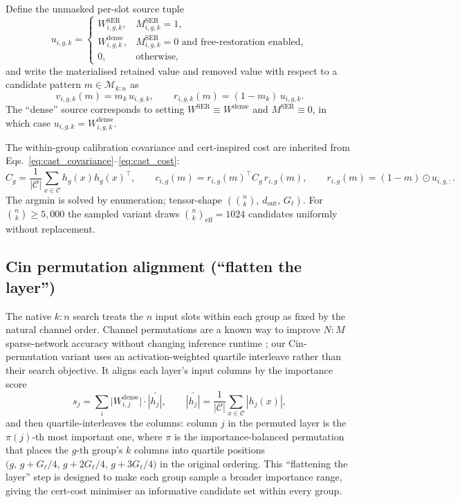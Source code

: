 \documentclass[11pt]{article}
\theoremstyle{plain}
\theoremstyle{definition}
\theoremstyle{remark}
\newcommand{\1}{\mathbf{1}}
\begin{document}
Define the unmasked per-slot source tuple
\begin{equation}
\label{eq:kn-source-tuple}
u_{i,g,k} = \begin{cases}
W^{\mathrm{SER}}_{i,g,k}, & M^{\mathrm{SER}}_{i,g,k} = 1, \\
W^{\mathrm{dense}}_{i,g,k}, & M^{\mathrm{SER}}_{i,g,k} = 0 \text{ and free-restoration enabled}, \\
0, & \text{otherwise},
\end{cases}
\end{equation}
and write the materialised retained value and removed value with respect to a candidate pattern $m\in\mathcal{M}_{k:n}$ as
\begin{equation}
\label{eq:kn-slot-values}
v_{i,g,k}(m) = m_k\,u_{i,g,k},
\qquad
r_{i,g,k}(m) = (1-m_k)\,u_{i,g,k}.
\end{equation}
The ``dense'' source corresponds to setting $W^{\mathrm{SER}} \equiv W^{\mathrm{dense}}$ and $M^{\mathrm{SER}} \equiv 0$, in which case $u_{i,g,k} = W^{\mathrm{dense}}_{i,g,k}$.

The within-group calibration covariance and cert-inspired cost are inherited from Eqs.~\ref{eq:cast_covariance}--\ref{eq:cast_cost}:
\begin{equation}
\label{eq:kn-cost}
C_g = \frac{1}{|\mathcal{C}|} \sum_{x \in \mathcal{C}} h_g(x) h_g(x)^\top,
\qquad
c_{i,g}(m) = r_{i,g}(m)^\top C_g\, r_{i,g}(m),
\qquad
r_{i,g}(m) = (1 - m) \odot u_{i,g,:}.
\end{equation}
The argmin is solved by enumeration; tensor-shape $(\binom{n}{k},\, d_{\mathrm{out}},\, G_\ell)$. For $\binom{n}{k}\ge 5{,}000$ the sampled variant draws $\binom{n}{k}_{\mathrm{eff}} = 1024$ candidates uniformly without replacement.

\subsection{Cin permutation alignment (``flatten the layer'')}
\label{subsec:perm}

The native $k{:}n$ search treats the $n$ input slots within each group as fixed by the natural channel order. Channel permutations are a known way to improve \(N{:}M\) sparse-network accuracy without changing inference runtime \citep{pool2021channel}; our Cin-permutation variant uses an activation-weighted quartile interleave rather than their search objective. It aligns each layer's input columns by the importance score
\[
s_j = \sum_i \bigl|W^{\mathrm{dense}}_{i,j}\bigr| \cdot \bar{|h_j|},
\qquad \bar{|h_j|} = \frac{1}{|\mathcal{C}|} \sum_{x \in \mathcal{C}} |h_{j}(x)|,
\]
and then quartile-interleaves the columns: column $j$ in the permuted layer is the $\pi(j)$-th most important one, where $\pi$ is the importance-balanced permutation that places the $g$-th group's $k$ columns into quartile positions $\bigl(g,\, g+G_\ell/4,\, g+2G_\ell/4,\, g+3G_\ell/4\bigr)$ in the original ordering. This ``flattening the layer'' step is designed to make each group sample a broader importance range, giving the cert-cost minimiser an informative candidate set within every group.
\end{document}
